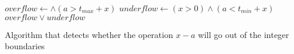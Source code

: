\begin{algorithm}[H]
    \begin{algorithmic}
            \State $overflow \gets $$ \wedge (a > t_{max} + x)$
            \State $underflow \gets (x > 0) \wedge (a < t_{min} + x)$
            \State \Return $overflow \vee underflow$
        \EndFunction
    \end{algorithmic}
    \caption{Algorithm that detects whether the operation $x - a$ will go out of the integer boundaries}
    \label{alg:basics:overflow:detect}
\end{algorithm}